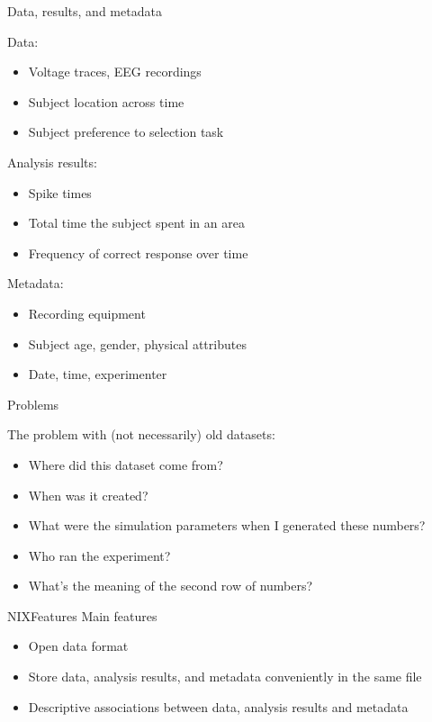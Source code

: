 \documentclass[10pt]{beamer}
\begin{document}
\begin{frame}{Data, results, and metadata}

    Data:
    \begin{itemize}
        \item Voltage traces, EEG recordings
        \item Subject location across time
        \item Subject preference to selection task
    \end{itemize}

    Analysis results:
    \begin{itemize}
        \item Spike times
        \item Total time the subject spent in an area
        \item Frequency of correct response over time
    \end{itemize}

    \pause{}

    Metadata:
    \begin{itemize}
        \item Recording equipment
        \item Subject age, gender, physical attributes
        \item Date, time, experimenter
    \end{itemize}

\end{frame}

\begin{frame}{Problems}
    
    The problem with (not necessarily) old datasets:
    \begin{itemize}
        \item Where did this dataset come from?
        \item When was it created?
        \item What were the simulation parameters when I generated these numbers?
        \item Who ran the experiment?
        \item What's the meaning of the second row of numbers?
    \end{itemize}
\end{frame}

\begin{frame}{NIX}{Features}
    Main features

    \begin{itemize}
        \item Open data format
        \item Store data, analysis results, and metadata conveniently in the same file
        \item Descriptive associations between data, analysis results and metadata
    \end{itemize}
\end{frame}
\end{document}
